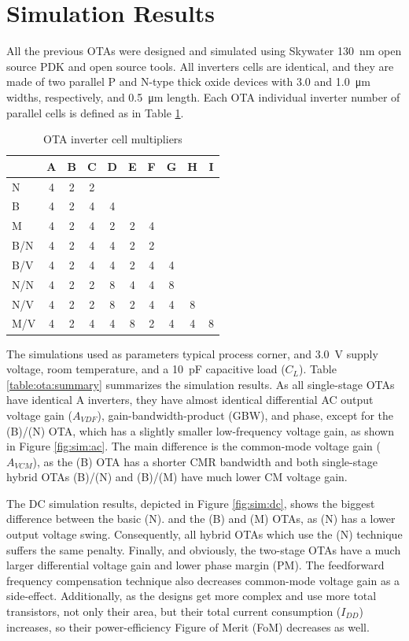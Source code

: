 \documentclass[conference]{IEEEtran}
\begin{document}
\section{Simulation Results}\label{sc:results}

All the previous OTAs were designed and simulated using Skywater 130~nm open source PDK and open source tools. All inverters cells are identical, and they are made of two parallel P and N-type thick oxide devices with 3.0 and 1.0~μm widths, respectively, and 0.5~μm length. Each OTA individual inverter number of parallel cells is defined as in Table \ref{table:ota:sizing}.

\begin{table}[htbp]
	\caption{OTA inverter cell multipliers}\label{table:ota:sizing}
	\centering
	\begin{tabular}{l|c c c c c c c c c}
	& A & B & C & D & E & F & G & H & I \\
\hline
N   & 4 & 2 & 2 &   &   &   &   &   &   \\
B   & 4 & 2 & 4 & 4 &   &   &   &   &   \\
M   & 4 & 2 & 4 & 2 & 2 & 4 &   &   &   \\
B/N & 4 & 2 & 4 & 4 & 2 & 2 &   &   &   \\
B/V & 4 & 2 & 4 & 4 & 2 & 4 & 4 &   &   \\
N/N & 4 & 2 & 2 & 8 & 4 & 4 & 8 &   &   \\
N/V & 4 & 2 & 2 & 8 & 2 & 4 & 4 & 8 &   \\
M/V & 4 & 2 & 4 & 4 & 8 & 2 & 4 & 4 & 8 \\
		\end{tabular}
\end{table}

The simulations used as parameters typical process corner, and 3.0~V supply voltage, room temperature, and a 10~pF capacitive load ($C_L$). Table \ref{table:ota:summary} summarizes the simulation results. As all single-stage OTAs have identical A inverters, they have almost identical differential AC output voltage gain ($A_{VDF}$), gain-bandwidth-product (GBW), and phase, except for the (B)/(N) OTA, which has a slightly smaller low-frequency voltage gain, as shown in Figure \ref{fig:sim:ac}. The main difference is the common-mode voltage gain ($A_{VCM}$), as the (B) OTA has a shorter CMR bandwidth and both single-stage hybrid OTAs (B)/(N) and (B)/(M) have much lower CM voltage gain.

The DC simulation results, depicted in Figure \ref{fig:sim:dc}, shows the biggest difference between the basic (N). and the (B) and (M) OTAs, as (N) has a lower output voltage swing. Consequently, all hybrid OTAs which use the (N) technique suffers the same penalty. Finally, and obviously, the two-stage OTAs have a much larger differential voltage gain and lower phase margin (PM). The feedforward frequency compensation technique also decreases common-mode voltage gain as a side-effect. Additionally, as the designs get more complex and use more total transistors, not only their area, but their total current consumption ($I_{DD}$) increases, so their power-efficiency Figure of Merit (FoM) decreases as well.
\end{document}
